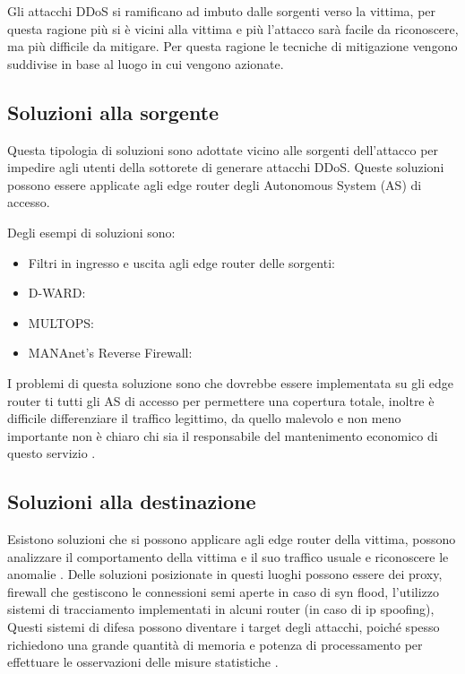 Gli attacchi DDoS si ramificano ad imbuto dalle sorgenti verso la vittima, per questa ragione più si è vicini alla vittima e più l'attacco sarà facile da riconoscere, ma più difficile da mitigare. Per questa ragione le tecniche di mitigazione vengono suddivise in base al luogo in cui vengono azionate.

\subsection{Soluzioni alla sorgente}
Questa tipologia di soluzioni sono adottate vicino alle sorgenti dell'attacco per impedire agli utenti della sottorete di generare attacchi DDoS. Queste soluzioni possono essere applicate agli edge router degli Autonomous System (AS) di accesso.

Degli esempi di soluzioni sono:

\begin{itemize}
    \item Filtri in ingresso e uscita agli edge router delle sorgenti:
    \item D-WARD:
    \item MULTOPS:
    \item MANAnet’s Reverse Firewall: 
\end{itemize}

I problemi di questa soluzione sono che dovrebbe essere implementata su gli edge router ti tutti gli AS di accesso per permettere una copertura totale, inoltre è difficile differenziare il traffico legittimo, da quello malevolo e non meno importante non è chiaro chi sia il responsabile del mantenimento economico di questo servizio \cite{ddos_survey_1}.

\subsection{Soluzioni alla destinazione}

Esistono soluzioni che si possono applicare agli edge router della vittima, possono analizzare il comportamento della vittima e il suo traffico usuale e riconoscere le anomalie \cite{ddos_survey_1,ddos_survey_2}.
Delle soluzioni posizionate in questi luoghi possono essere dei proxy, firewall che gestiscono le connessioni semi aperte in caso di syn flood, l'utilizzo sistemi di tracciamento implementati in alcuni router (in caso di ip spoofing), %
Questi sistemi di difesa possono diventare i target degli attacchi, poiché spesso richiedono una grande quantità di memoria e potenza di processamento per effettuare le osservazioni delle misure statistiche \cite{ddos_survey_4}.

